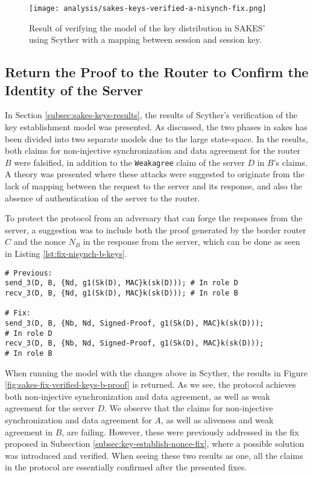 \begin{figure}[H]
	\centering
	\texttt{[image: analysis/sakes-keys-verified-a-nisynch-fix.png]}
	\caption{Result of verifying the model of the key distribution in SAKES' using Scyther with a mapping between session and session key.}
	\label{fig:sakes-fix-verified-keys-a-nisynch}
\end{figure}



\subsection{Return the Proof to the Router to Confirm the Identity of the Server}

In Section \ref{subsec:sakes-keys-results}, the results of Scyther's verification of the key establishment model was presented. As discussed, the two phases in \gls{sakes} has been divided into two separate models due to the large state-space. In the results, both claims for non-injective synchronization and data agreement for the router $B$ were falsified, in addition to the \texttt{Weakagree} claim of the server $D$ in $B$'s claims. A theory was presented where these attacks were suggested to originate from the lack of mapping between the request to the server and its response, and also the absence of authentication of the server to the router.

To protect the protocol from an adversary that can forge the responses from the server, a suggestion was to include both the proof generated by the border router $C$ and the nonce $N_B$ in the response from the server, which can be done as seen in Listing \ref{lst:fix-nisynch-b-keys}.

\begin{lstlisting}[caption={Fix to the SAKES protocol to provide authentication of the remote server D to the router B in the key establishment phase.}, label={lst:fix-nisynch-b-keys}, style=code-improvements-sakes-3]
# Previous:
send_3(D, B, {Nd, g1(Sk(D), MAC}k(sk(D))); # In role D
recv_3(D, B, {Nd, g1(Sk(D), MAC}k(sk(D))); # In role B

# Fix:
send_3(D, B, {Nb, Nd, Signed-Proof, g1(Sk(D), MAC}k(sk(D)));
# In role D
recv_3(D, B, {Nb, Nd, Signed-Proof, g1(Sk(D), MAC}k(sk(D)));
# In role B
\end{lstlisting}

When running the model with the changes above in Scyther, the results in Figure \ref{fig:sakes-fix-verified-keys-b-proof} is returned. As we see, the protocol achieves both non-injective synchronization and data agreement, as well as weak agreement for the server $D$. We observe that the claims for non-injective synchronization and data agreement for $A$, as well as aliveness and weak agreement in $B$, are failing. However, these were previously addressed in the fix proposed in Subsection \ref{subsec:key-establish-nonce-fix}, where a possible solution was introduced and verified. When seeing these two results as one, all the claims in the protocol are essentially confirmed after the presented fixes.


